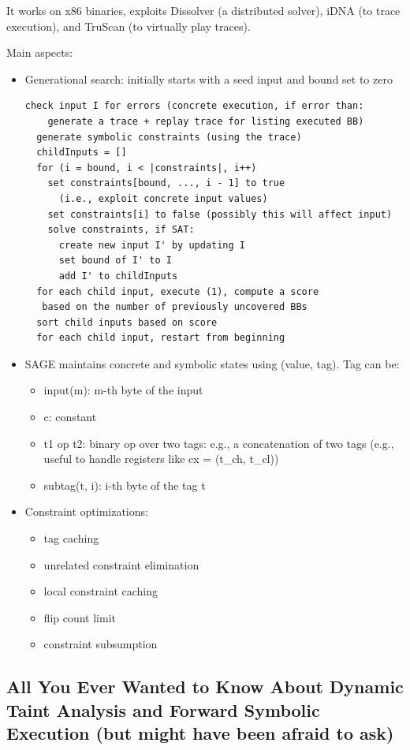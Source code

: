 \documentclass[10pt, a4paper]{article}
\begin{document}
It works on x86 binaries, exploits Dissolver (a distributed solver), iDNA (to trace execution), and TruScan (to virtually play traces). 

Main aspects:
\begin{itemize}
  \item Generational search: initially starts with a seed input and bound set to zero
    \begin{lstlisting}[mathescape=true]
  check input I for errors (concrete execution, if error than: 
    generate a trace + replay trace for listing executed BB)
  generate symbolic constraints (using the trace)
  childInputs = []
  for (i = bound, i < |constraints|, i++)
    set constraints[bound, ..., i - 1] to true 
      (i.e., exploit concrete input values)
    set constraints[i] to false (possibly this will affect input)
    solve constraints, if SAT:
      create new input I' by updating I
      set bound of I' to I
      add I' to childInputs 
  for each child input, execute (1), compute a score
   based on the number of previously uncovered BBs
  sort child inputs based on score
  for each child input, restart from beginning 
    \end{lstlisting}
    \item SAGE maintains concrete and symbolic states using (value, tag). Tag can be:
      \begin{itemize}
        \item input(m): m-th byte of the input
        \item c: constant
        \item t1 op t2: binary op over two tags: e.g., a concatenation of two tags (e.g., useful to handle registers like cx = (t\_ch, t\_cl))
        \item subtag(t, i): i-th byte of the tag t
      \end{itemize}
    \item Constraint optimizations:
      \begin{itemize}
        \item tag caching
        \item unrelated constraint elimination
        \item local constraint caching
        \item flip count limit
        \item constraint subsumption
      \end{itemize}
\end{itemize}

\subsection{\cite{SAB-SP10} All You Ever Wanted to Know About Dynamic Taint Analysis and Forward Symbolic Execution (but might have been afraid to ask)}
\end{document}
